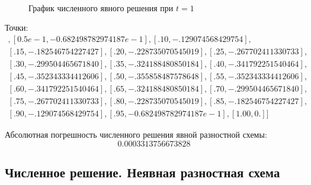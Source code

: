 \documentclass[14pt,a4paper]{scrartcl}
\begin{document}
\begin{figure}[H]
	\begin{minipage}[h]{1\linewidth}
		\\
		\caption{График численного явного решения при $t=1$}
	\end{minipage}
\end{figure}

Точки:
\begin{align*}
[[0., 0.], [0.5e-1, -0.682498782974187e-1], [.10, -.129074568429754],\\
 [.15, -.182546754227427], [.20, -.228735070545019], [.25, -.267702411330733],\\
  [.30, -.299504465671840], [.35, -.324188480850184], [.40, -.341792251540464], \\
  [.45, -.352343334412606], [.50, -.355858487578648], [.55, -.352343334412606],\\
   [.60, -.341792251540464], [.65, -.324188480850184], [.70, -.299504465671840], \\
   [.75, -.267702411330733], [.80, -.228735070545019], [.85, -.182546754227427],\\
    [.90, -.129074568429754], [.95, -0.682498782974187e-1], [1.00, 0.]]
\end{align*}



Абсолютная погрешность численного решения явной разностной схемы: $$0.0003313756673828$$

\pagebreak
\subsection*{Численное решение. Неявная разностная схема}
\end{document}
